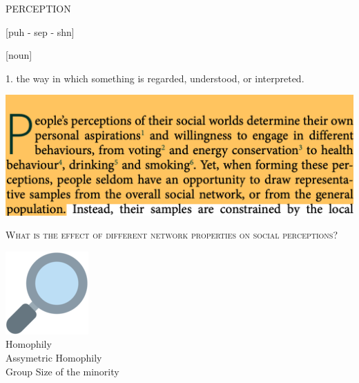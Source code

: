 \documentclass{beamer}
\begin{document}
\begin{frame}
    \begin{center}
    \begin{minipage}{.5\textwidth}
        \LARGE{PERCEPTION}
    \end{minipage}
    \begin{minipage}{.3\textwidth}
        \normalsize{[puh - sep - shn]}
    \end{minipage}
    \vspace{.5cm}

    \hspace{-8cm} \normalsize{[noun]}\\
    \end{center}
    \hspace{.8cm} \normalsize{1. the way in which something is regarded, understood, or interpreted.}
\end{frame}

\begin{frame}
    \begin{center}
        \includegraphics[width=.75\textwidth]{static/perception.png}
    \end{center}
\end{frame}

\begin{frame}
    \begin{center}
        \large{\textsc{What is the effect of different network properties on social perceptions?}}

    \end{center}
\end{frame}


\begin{frame}
    \begin{center}
        \includegraphics[width=.07\textwidth]{static/search.png} \\ \vspace{.5cm}
        \large{Homophily} \\ \vspace{.5cm}
        \large{Assymetric Homophily} \\ \vspace{.5cm}
        \large{Group Size of the minority}
    \end{center}
\end{frame}
\end{document}
